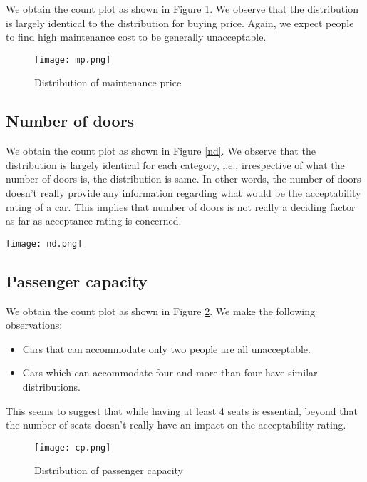 \documentclass[conference]{IEEEtran}
\begin{document}
We obtain the count plot as shown in Figure \ref{mp}. We observe that the distribution is largely identical to the distribution for buying price. Again, we expect people to find high maintenance cost to be generally unacceptable.  

\begin{figure}[tbh]
\centering
\texttt{[image: mp.png]}
\caption{Distribution of maintenance price}
\label{mp}
\end{figure}

\subsection*{Number of doors}

We obtain the count plot as shown in Figure \ref{nd}. We observe that the distribution is largely identical for each category, i.e., irrespective of what the number of doors is, the distribution is same. In other words, the number of doors doesn't really provide any information regarding what would be the acceptability rating of a car. This implies that number of doors is not really a deciding factor as far as acceptance rating is concerned.

\begin{figure*}[tbh]
\centering
\texttt{[image: nd.png]}
\caption{Distribution of number of doors}
\label{nd}
\end{figure*}

\subsection*{Passenger capacity}

We obtain the count plot as shown in Figure \ref{cp}. We make the following observations:

\begin{itemize}
    \item Cars that can accommodate only two people are all unacceptable.
    \item Cars which can accommodate four and more than four have similar distributions.
\end{itemize}

This seems to suggest that while having at least 4 seats is essential, beyond that the number of seats doesn't really have an impact on the acceptability rating.

\begin{figure}[tbh]
\centering
\texttt{[image: cp.png]}
\caption{Distribution of passenger capacity}
\label{cp}
\end{figure}
\end{document}
